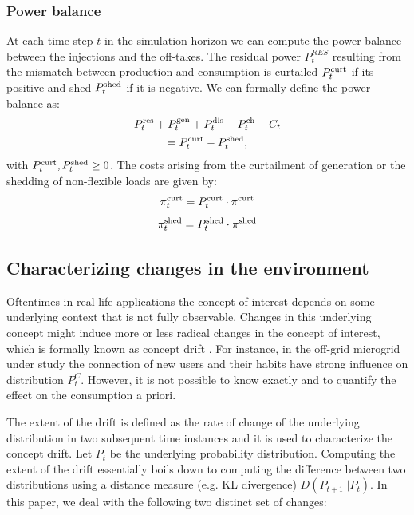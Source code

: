 \documentclass{article}
\begin{document}
\subsubsection{Power balance}
    At each time-step $t$ in the simulation horizon we can compute the power balance between the injections and the off-takes. The residual power $P_t^{RES}$ resulting from the mismatch between production and consumption is curtailed $P^\text{curt}_t$ if its positive and shed $P^\text{shed}_t$ if it is negative. We can formally define the power balance as:
    \begin{gather}
    P^\text{res}_t + P^\text{gen}_t + P^{\text{dis}}_t - P^{\text{ch}}_t - C_t\\\notag
    =P^\text{curt}_t - P^\text{shed}_t,\label{eqn: powerbalance}
    \end{gather}
    with $P^\text{curt}_t , P^\text{shed}_t \geq 0$.
    The costs arising from the curtailment of generation or the shedding of non-flexible loads are given by: 
    \begin{gather}
    \pi^{\text{curt}}_t = P^\text{curt}_t \cdot \pi^{\text{curt}} \label{eqn: curtcost}
    \end{gather}
    \begin{gather}
    \pi^{\text{shed}}_t = P^\text{shed}_t \cdot \pi^{\text{shed}} \label{eqn: shedcost}
    \end{gather}
    


\subsection{Characterizing changes in the environment}
	
	Oftentimes in real-life applications the concept of interest depends on some underlying context that is not fully observable. Changes in this underlying concept might induce more or less radical changes in the concept of interest, which is formally known as concept drift \cite{tsymbal2004problem}. For instance, in the off-grid microgrid under study the connection of new users and their habits have strong influence on distribution $ P^{C}_{t}$. However, it is not possible to know exactly and to quantify the effect on the consumption a priori. 
	
	The extent of the drift is defined as the rate of change of the underlying distribution in two subsequent time instances and it is used to characterize the concept drift. Let $P_{t}$ be the underlying probability distribution. Computing the extent of the drift essentially boils down to computing the difference between two distributions using a distance measure (e.g. KL divergence) $D(P_{t+1}||P_{t})$.
	In this paper, we deal with the following two distinct set of changes:
	
\end{document}
